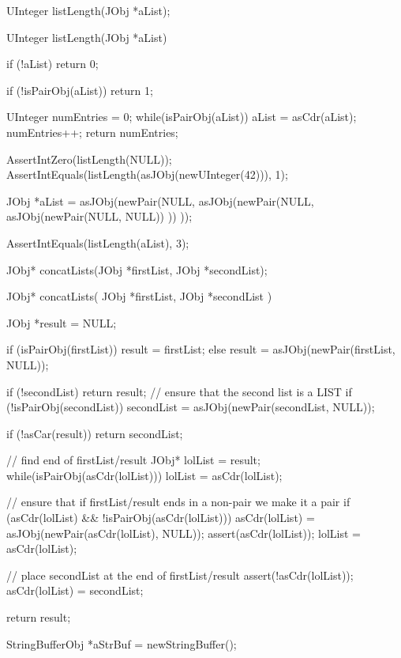 \startTestSuite[listLength]

\startCHeader
UInteger listLength(JObj *aList);
\stopCHeader

\startCCode
UInteger listLength(JObj *aList) {
  if (!aList) return 0;
  
  if (!isPairObj(aList)) return 1;
  
  UInteger numEntries = 0;
  while(isPairObj(aList)) {
    aList = asCdr(aList);
    numEntries++;
  }
  return numEntries;
}
\stopCCode


\startCTest
  AssertIntZero(listLength(NULL));
  AssertIntEquals(listLength(asJObj(newUInteger(42))), 1);

  JObj *aList =
    asJObj(newPair(NULL, 
      asJObj(newPair(NULL,
        asJObj(newPair(NULL, NULL))
      ))
    ));
  
  AssertIntEquals(listLength(aList), 3);
\stopCTest
\stopTestCase
\stopTestSuite

\startTestSuite[concatLists]

\startCHeader
JObj* concatLists(JObj *firstList, JObj *secondList);
\stopCHeader

\startCCode
JObj* concatLists(
  JObj *firstList,
  JObj *secondList
) {
  JObj *result = NULL;
 
  if (isPairObj(firstList)) {
    result = firstList;
  } else {
    result = asJObj(newPair(firstList, NULL));
  }
 
  if (!secondList) return result;
  // ensure that the second list is a LIST
  if (!isPairObj(secondList)) {
    secondList = asJObj(newPair(secondList, NULL));
  }

  if (!asCar(result)) return secondList;
 
  // find end of firstList/result
  JObj* lolList = result;
  while(isPairObj(asCdr(lolList))) {
    lolList = asCdr(lolList);
  }

  // ensure that if firstList/result ends in a non-pair we make it a pair
  if (asCdr(lolList) && !isPairObj(asCdr(lolList))) {
    asCdr(lolList) = asJObj(newPair(asCdr(lolList), NULL));
    assert(asCdr(lolList));
    lolList = asCdr(lolList);
  }

  // place secondList at the end of firstList/result
  assert(!asCdr(lolList));
  asCdr(lolList) = secondList;
 
  return result;
}
\stopCCode

\startCTest
  StringBufferObj *aStrBuf = newStringBuffer();
  
